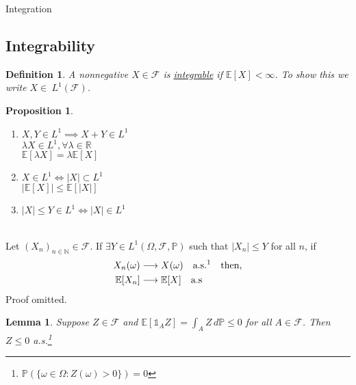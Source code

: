\documentclass[12pt]{article}
\newenvironment{theorem}[2][Theorem:]{\begin{trivlist} %
\item[\hskip \labelsep {\bfseries #1}\hskip \labelsep {\bfseries #2.}]}{\end{trivlist}}
\newtheorem{definition}{Definition}
\newtheorem{lemma}{Lemma}
\newtheorem{proposition}{Proposition}
\begin{document}
\begin{section}{Integration}
\subsection{Integrability}

\begin{definition} \label{def:integrable} A nonnegative $X \in \mathcal F$ is \underline{integrable} if $\mathbb E[X] < \infty$. To show this we write $X \in \ L^1(\mathcal F)$.
\end{definition}

\begin{proposition}\hfill
\begin{enumerate}
	\item $X, Y \in L^1 \implies X + Y \in L^1$ \\
		$\lambda X \in L^1, \forall\lambda \in \mathbb R$ \\
		$\mathbb E[\lambda X] = \lambda \mathbb E[X]$
	\item $X \in L^1 \iff |X| \subset L^1$ \\
		$|\mathbb E[X]| \leq \mathbb E[|X|]$
	\item $|X| \leq Y \in L^1 \iff |X| \in L^1$
\end{enumerate}
\end{proposition}

\begin{theorem}{(Lebesgue) Dominated Convergence Theorem} \hfill\\
Let $(X_n)_{n \in \mathbb N} \in \mathcal F$. If $\exists Y \in L^1(\Omega, \mathcal F, \mathbb P)$ such that $|X_n| \leq Y$ for all $n$, if
\begin{align*}
	X_n(\omega) &\longrightarrow X(\omega) \quad \text{a.s.\footnotemark} \quad \text{then,} \\
	\mathbb E[X_n] &\longrightarrow \mathbb E[X] \quad \text{a.s}
\end{align*}
Proof omitted.
\end{theorem}

\begin{lemma} Suppose $Z \in \mathcal F$ and $\mathbb E[\mathds 1_A Z] = \int_A Z\,d\mathbb P \leq 0$ for all $A \in \mathcal F$. Then $Z \leq 0$ a.s.\footnote{$\mathbb P(\{\omega \in \Omega : Z(\omega) > 0\}) = 0$}
\end{lemma}


\end{section}
\end{document}
